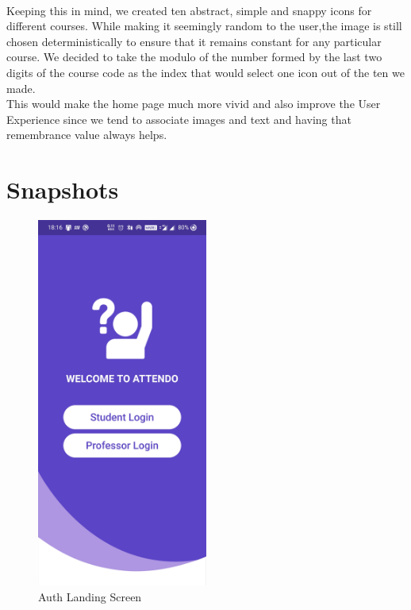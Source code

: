 \documentclass{article}
\begin{document}
\\Keeping this in mind, we created ten abstract, simple and snappy icons for different courses. While making it seemingly random to the user,the image is still chosen deterministically to ensure that it remains constant for any particular course. We decided to take the modulo of the number formed by the last two digits of the course code as the index that would select one icon out of the ten we made. 
\\This would make the home page much more vivid and also improve the User Experience since we tend to associate images and text and having that remembrance value always helps.

\section{Snapshots}
\begin{figure}[H]
    \centering
    \includegraphics[width=0.50\textwidth]{HomeScreen[1].jpg}
    \caption{Auth Landing Screen}
    \label{fig:HomeScreen}
\end{figure}
\end{document}
